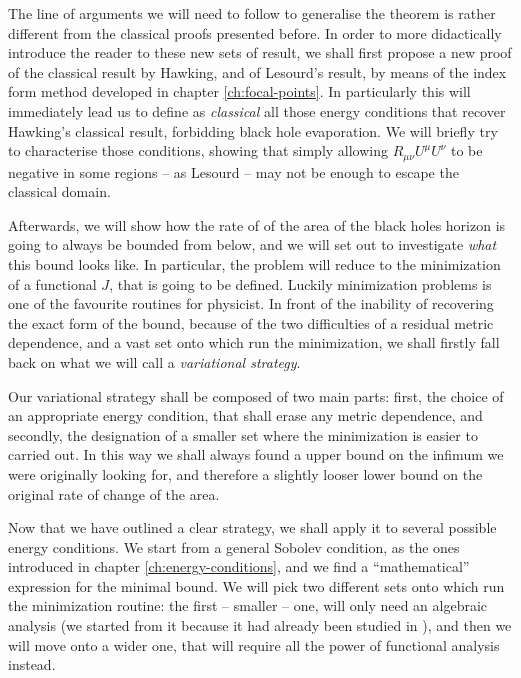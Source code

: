 The line of arguments we will need to follow to generalise the theorem is rather different from the classical proofs presented before. In order to more didactically introduce the reader to these new sets of result, we shall first propose a new proof of the classical result by Hawking, and of Lesourd's result, by means of the index form method developed in chapter \ref{ch:focal-points}. In particularly this will immediately lead us to define as \emph{classical} all those energy conditions that recover Hawking's classical result, forbidding black hole evaporation. We will briefly try to characterise those conditions, showing that simply allowing \(R_{\mu\nu}U^{\mu}U^{\nu}\) to be negative in some regions -- as Lesourd -- may not be enough to escape the classical domain.

Afterwards, we will show how the rate of of the area of the black holes horizon is going to always be bounded from below, and we will set out to investigate \emph{what} this bound looks like. In particular, the problem will reduce to the minimization of a functional \(J\), that is going to be defined.
Luckily minimization problems is one of the favourite routines for physicist. In front of the inability of recovering the exact form of the bound, because of the two difficulties of a residual metric dependence, and a vast set onto which run the minimization, we shall firstly fall back on what we will call a \emph{variational strategy}.

Our variational strategy shall be composed of two main parts: first, the choice of an appropriate energy condition, that shall erase any metric dependence, and secondly, the designation of a smaller set where the minimization is easier to carried out. In this way we shall always found a upper bound on the infimum we were originally looking for, and therefore a slightly looser lower bound on the original rate of change of the area.

Now that we have outlined a clear strategy, we shall apply it to several possible energy conditions. We start from a general Sobolev condition, as the ones introduced in chapter \ref{ch:energy-conditions}, and we find a ``mathematical'' expression for the minimal bound. We will pick two different sets onto which run the minimization routine: the first -- smaller -- one, will only need an algebraic analysis (we started from it because it had already been studied in \cite[]{fewster2020new}), and then we will move onto a wider one, that will require all the power of functional analysis instead.

